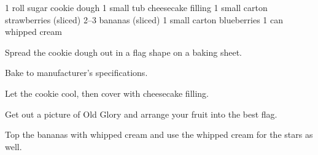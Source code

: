 \dishtype{\dessert}
\dishother{\vegetarian}
\begin{ingreds}
    1 roll sugar cookie dough
    1 small tub cheesecake filling
    1 small carton strawberries (sliced)
    2--3 bananas (sliced)
    1 small carton blueberries
    1 can whipped cream
\end{ingreds}
\begin{method}
    Spread the cookie dough out in a flag shape on a baking sheet.\par
    Bake to manufacturer's specifications.\par
    Let the cookie cool, then cover with cheesecake filling.\par
    Get out a picture of Old Glory and arrange your fruit into the best flag.\par
    Top the bananas with whipped cream and use the whipped cream for the stars as well.
\end{method}